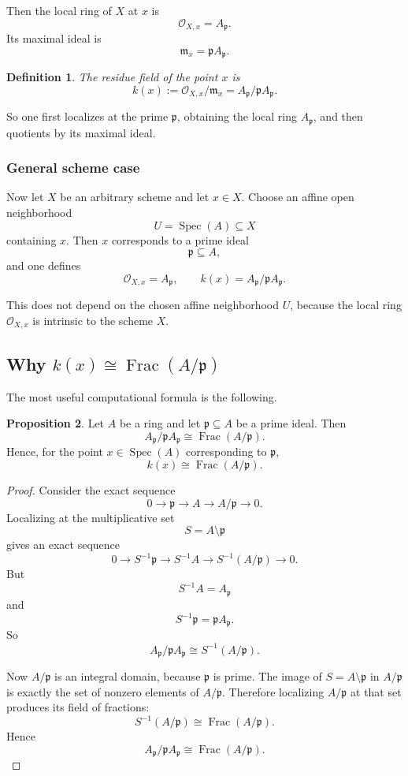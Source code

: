 \documentclass[12pt,a4paper]{article}
\theoremstyle{notespace}
\newtheorem{definition}{Definition}[section]
\newcommand{\Spec}{\operatorname{Spec}}
\newcommand{\Frac}{\operatorname{Frac}}
\newcommand{\OO}{\mathcal O}
\newcommand{\m}{\mathfrak m}
\newcommand{\p}{\mathfrak p}
\theoremstyle{definition}
\newtheorem{proposition}[definition]{Proposition}
\begin{document}
Then the local ring of \(X\) at \(x\) is
\[
\OO_{X,x}=A_{\p}.
\]
Its maximal ideal is
\[
\m_x=\p A_{\p}.
\]

\begin{definition}
	The \emph{residue field} of the point \(x\) is
	\[
	k(x):=\OO_{X,x}/\m_x=A_{\p}/\p A_{\p}.
	\]
\end{definition}

So one first localizes at the prime \(\p\), obtaining the local ring \(A_{\p}\), and then quotients by its maximal ideal.

\subsubsection{General scheme case}

Now let \(X\) be an arbitrary scheme and let \(x\in X\).  
Choose an affine open neighborhood
\[
U=\Spec(A)\subseteq X
\]
containing \(x\). Then \(x\) corresponds to a prime ideal
\[
\p\subseteq A,
\]
and one defines
\[
\OO_{X,x}=A_{\p},\qquad k(x)=A_{\p}/\p A_{\p}.
\]

This does not depend on the chosen affine neighborhood \(U\), because the local ring \(\OO_{X,x}\) is intrinsic to the scheme \(X\).

\subsection{Why \(k(x)\cong \Frac(A/\p)\)}

The most useful computational formula is the following.

\begin{proposition}
	Let \(A\) be a ring and let \(\p\subseteq A\) be a prime ideal.  
	Then
	\[
	A_{\p}/\p A_{\p}\cong \Frac(A/\p).
	\]
	Hence, for the point \(x\in \Spec(A)\) corresponding to \(\p\),
	\[
	k(x)\cong \Frac(A/\p).
	\]
\end{proposition}

\begin{proof}
	Consider the exact sequence
	\[
	0\longrightarrow \p \longrightarrow A \longrightarrow A/\p \longrightarrow 0.
	\]
	Localizing at the multiplicative set
	\[
	S=A\setminus \p
	\]
	gives an exact sequence
	\[
	0\longrightarrow S^{-1}\p \longrightarrow S^{-1}A \longrightarrow S^{-1}(A/\p)\longrightarrow 0.
	\]
	But
	\[
	S^{-1}A=A_{\p}
	\]
	and
	\[
	S^{-1}\p=\p A_{\p}.
	\]
	So
	\[
	A_{\p}/\p A_{\p}\cong S^{-1}(A/\p).
	\]
	
	Now \(A/\p\) is an integral domain, because \(\p\) is prime.  
	The image of \(S=A\setminus \p\) in \(A/\p\) is exactly the set of nonzero elements of \(A/\p\).  
	Therefore localizing \(A/\p\) at that set produces its field of fractions:
	\[
	S^{-1}(A/\p)\cong \Frac(A/\p).
	\]
	Hence
	\[
	A_{\p}/\p A_{\p}\cong \Frac(A/\p).
	\]
\end{proof}
\end{document}
